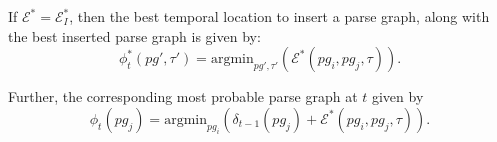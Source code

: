 \documentclass[10pt,journal,letterpaper,compsoc]{IEEEtran}
\begin{document}
If $\mathcal{E}^{*} = \mathcal{E}^{*}_{I}$, then the best temporal location to insert a parse graph, along with the best inserted parse graph is given by:
\begin{equation}
\label{eq:phi_star}
\phi^{*}_t(pg', \tau') = \mathrm{argmin}_{pg', \tau'} \left( \mathcal{E}^{*}(pg_i, pg_j, \tau ) \right). %
\end{equation}


Further, the corresponding most probable parse graph at $t$ given by
\begin{equation}
\label{eq:phi}
\phi_t(pg_j) = \mathrm{argmin}_{pg_i} \left(\delta_{t-1}(pg_j) + \mathcal{E}^{*}(pg_i, pg_j, \tau ) \right). 
\end{equation}












%

%
%
%
\end{document}

